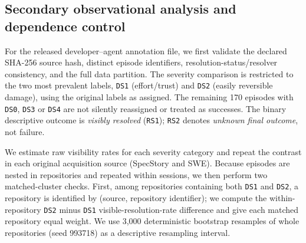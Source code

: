 \subsection{Secondary observational analysis and dependence control}
For the released developer--agent annotation file, we first validate the declared SHA-256 source hash, distinct episode identifiers, resolution-status/resolver consistency, and the full data partition. The severity comparison is restricted to the two most prevalent labels, \texttt{DS1} (effort/trust) and \texttt{DS2} (easily reversible damage), using the original labels as assigned. The remaining 170 episodes with \texttt{DS0}, \texttt{DS3} or \texttt{DS4} are not silently reassigned or treated as successes. The binary descriptive outcome is \emph{visibly resolved} (\texttt{RS1}); \texttt{RS2} denotes \emph{unknown final outcome}, not failure.

We estimate raw visibility rates for each severity category and repeat the contrast in each original acquisition source (SpecStory and SWE). Because episodes are nested in repositories and repeated within sessions, we then perform two matched-cluster checks. First, among repositories containing both \texttt{DS1} and \texttt{DS2}, a repository is identified by (source, repository identifier); we compute the within-repository \texttt{DS2} minus \texttt{DS1} visible-resolution-rate difference and give each matched repository equal weight. We use 3,000 deterministic bootstrap resamples of whole repositories (seed 993718) as a descriptive resampling interval.

